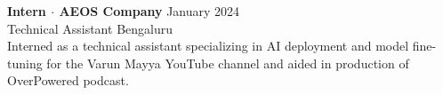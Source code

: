 \item{
    \textbf{Intern $\cdot$ AEOS Company} \hfill {January 2024} \\
    {Technical Assistant} \hfill {Bengaluru} \\
    {Interned as a technical assistant specializing in AI deployment and model fine-tuning for the Varun Mayya YouTube channel and aided in production of OverPowered podcast.} \\
}

